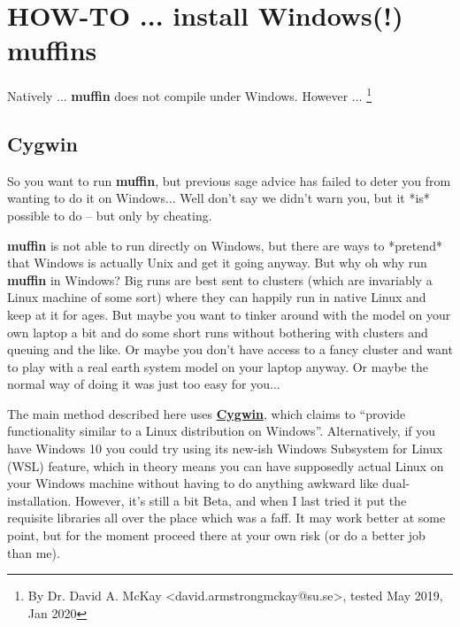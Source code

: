 \documentclass[11pt,fleqn]{book} %
\begin{document}

\newpage



\section{HOW-TO ... install Windows(!) muffins}\label{how-to-windows}
\vspace{2mm}


Natively ... \textbf{muffin} does not compile under Windows. However
... \footnote{By Dr. David A. McKay <david.armstrongmckay@su.se>,
  tested May 2019, Jan 2020 }

%
\subsection*{Cygwin}\label{cygwin}

So you want to run \textbf{muffin}, but previous sage advice has
failed to deter you from wanting to do it on Windows... Well don’t say
we didn’t warn you, but it *is* possible to do – but only by cheating.

\textbf{muffin} is not able to run directly on Windows, but there are
ways to *pretend* that Windows is actually Unix and get it going
anyway. But why oh why run \textbf{muffin} in Windows? Big runs are
best sent to clusters (which are invariably a Linux machine of some
sort) where they can happily run in native Linux and keep at it for
ages. But maybe you want to tinker around with the model on your own
laptop a bit and do some short runs without bothering with clusters
and queuing and the like. Or maybe you don’t have access to a fancy
cluster and want to play with a real earth system model on your laptop
anyway. Or maybe the normal way of doing it was just too easy for you...

The main method described here uses
\href{https://www.cygwin.com/faq.html#faq.what.what}{\textbf{Cygwin}},
which claims to ``provide functionality similar to a Linux
distribution on Windows''. Alternatively, if you have Windows 10 you
could try using its new-ish Windows Subsystem for Linux (WSL) feature,
which in theory means you can have supposedly actual Linux on your
Windows machine without having to do anything awkward like
dual-installation. However, it’s still a bit Beta, and when I last
tried it put the requisite libraries all over the place which was a
faff. It may work better at some point, but for the moment proceed
there at your own risk (or do a better job than me).
\end{document}
